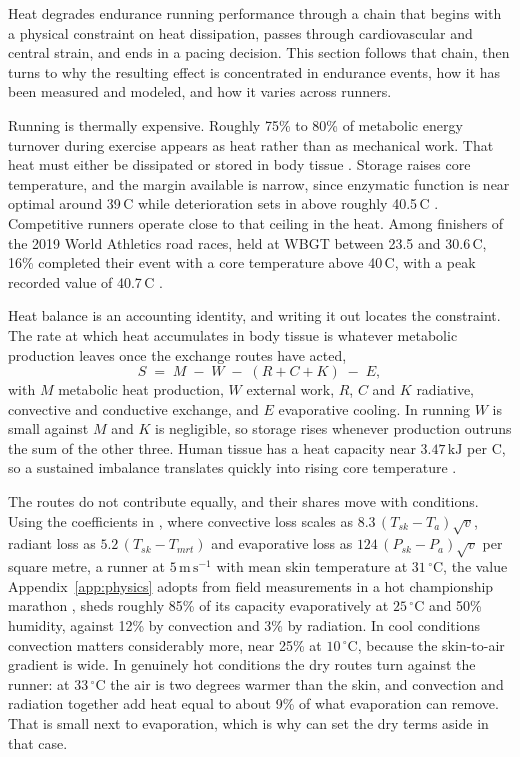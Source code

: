 \documentclass[11pt]{article}
\renewcommand{\_}{\textunderscore\allowbreak}
\begin{document}
Heat degrades endurance running performance through a chain that begins with a physical constraint on heat dissipation, passes through cardiovascular and central strain, and ends in a pacing decision. This section follows that chain, then turns to why the resulting effect is concentrated in endurance events, how it has been measured and modeled, and how it varies across runners.

Running is thermally expensive. Roughly 75\% to 80\% of metabolic energy turnover during exercise appears as heat rather than as mechanical work. That heat must either be dissipated or stored in body tissue \citep{maughan2007}. Storage raises core temperature, and the margin available is narrow, since enzymatic function is near optimal around 39\,\textdegree C while deterioration sets in above roughly 40.5\,\textdegree C \citep{martin2007}. Competitive runners operate close to that ceiling in the heat. Among finishers of the 2019 World Athletics road races, held at WBGT between 23.5 and 30.6\,\textdegree C, 16\% completed their event with a core temperature above 40\,\textdegree C, with a peak recorded value of 40.7\,\textdegree C \citep{aylwin2023}.

Heat balance is an accounting identity, and writing it out locates the constraint. The rate at which heat accumulates in body tissue is whatever metabolic production leaves once the exchange routes have acted,
\begin{equation}
  S \;=\; M \;-\; W \;-\; (R + C + K) \;-\; E,
\end{equation}
with $M$ metabolic heat production, $W$ external work, $R$, $C$ and $K$ radiative, convective and conductive exchange, and $E$ evaporative cooling. In running $W$ is small against $M$ and $K$ is negligible, so storage rises whenever production outruns the sum of the other three. Human tissue has a heat capacity near $3.47\,\mathrm{kJ}$ per \textdegree C, so a sustained imbalance translates quickly into rising core temperature \citep{maughan2010}.

The routes do not contribute equally, and their shares move with conditions. Using the coefficients in \citet{taylor2006}, where convective loss scales as $8.3\,(T_{sk}-T_a)\sqrt{v}$, radiant loss as $5.2\,(T_{sk}-T_{mrt})$ and evaporative loss as $124\,(P_{sk}-P_a)\sqrt{v}$ per square metre, a runner at $5\,\mathrm{m\,s^{-1}}$ with mean skin temperature at $31\,^{\circ}$C, the value Appendix~\ref{app:physics} adopts from field measurements in a hot championship marathon \citep{aylwin2023}, sheds roughly 85\% of its capacity evaporatively at $25\,^{\circ}$C and 50\% humidity, against 12\% by convection and 3\% by radiation. In cool conditions convection matters considerably more, near 25\% at $10\,^{\circ}$C, because the skin-to-air gradient is wide. In genuinely hot conditions the dry routes turn against the runner: at $33\,^{\circ}$C the air is two degrees warmer than the skin, and convection and radiation together add heat equal to about 9\% of what evaporation can remove. That is small next to evaporation, which is why \citet{taylor2006} can set the dry terms aside in that case.
\end{document}
